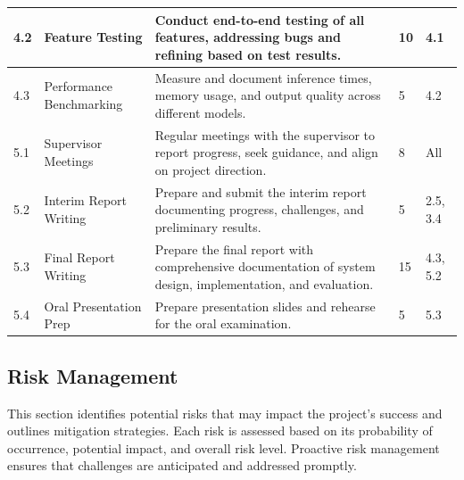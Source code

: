 \documentclass[12pt,a4paper]{report}
\begin{document}
\begin{longtable}{|p{0.6cm}|p{2.6cm}|p{5.8cm}|p{1.4cm}|p{1.8cm}|}
\hline
4.2 & Feature Testing & Conduct end-to-end testing of all features, addressing bugs and refining based on test results. & 10 & 4.1 \\
\hline
4.3 & Performance Benchmarking & Measure and document inference times, memory usage, and output quality across different models. & 5 & 4.2 \\
\hline
5.1 & Supervisor Meetings & Regular meetings with the supervisor to report progress, seek guidance, and align on project direction. & 8 & All \\
\hline
5.2 & Interim Report Writing & Prepare and submit the interim report documenting progress, challenges, and preliminary results. & 5 & 2.5, 3.4 \\
\hline
5.3 & Final Report Writing & Prepare the final report with comprehensive documentation of system design, implementation, and evaluation. & 15 & 4.3, 5.2 \\
\hline
5.4 & Oral Presentation Prep & Prepare presentation slides and rehearse for the oral examination. & 5 & 5.3 \\
\hline

\end{longtable}
\normalsize

\subsection{Risk Management}

This section identifies potential risks that may impact the project's success and outlines mitigation strategies. Each risk is assessed based on its probability of occurrence, potential impact, and overall risk level. Proactive risk management ensures that challenges are anticipated and addressed promptly.
\end{document}
